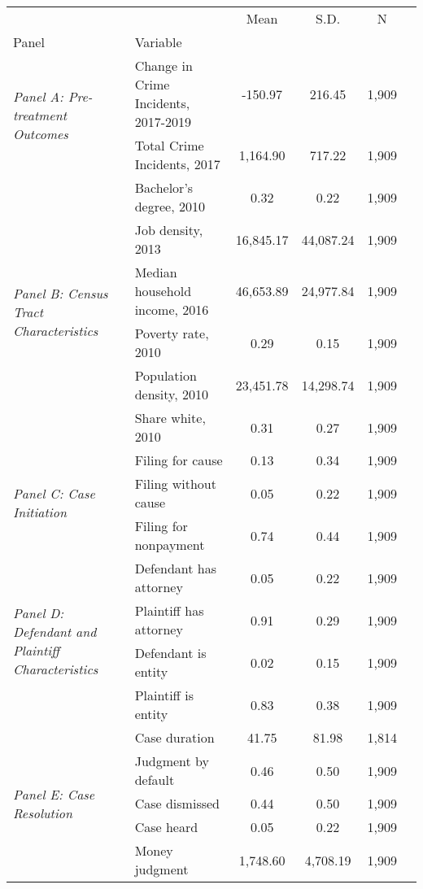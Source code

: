 \begin{tabular}{llcccc}
\toprule
 &  & Mean & S.D. & N \\
Panel & Variable &  &  &  \\
\midrule
\multirow[c]{2}{4cm}{\textit{Panel A: Pre-treatment Outcomes}} & Change in Crime Incidents, 2017-2019 & -150.97 & 216.45 & 1,909 \\
 & Total Crime Incidents, 2017 & 1,164.90 & 717.22 & 1,909 \\
\cline{1-5}
\multirow[c]{6}{4cm}{\textit{Panel B: Census Tract Characteristics}} & Bachelor's degree, 2010 & 0.32 & 0.22 & 1,909 \\
 & Job density, 2013 & 16,845.17 & 44,087.24 & 1,909 \\
 & Median household income, 2016 & 46,653.89 & 24,977.84 & 1,909 \\
 & Poverty rate, 2010 & 0.29 & 0.15 & 1,909 \\
 & Population density, 2010 & 23,451.78 & 14,298.74 & 1,909 \\
 & Share white, 2010 & 0.31 & 0.27 & 1,909 \\
\cline{1-5}
\multirow[c]{3}{4cm}{\textit{Panel C: Case Initiation}} & Filing for cause & 0.13 & 0.34 & 1,909 \\
 & Filing without cause & 0.05 & 0.22 & 1,909 \\
 & Filing for nonpayment & 0.74 & 0.44 & 1,909 \\
\cline{1-5}
\multirow[c]{4}{4cm}{\textit{Panel D: Defendant and Plaintiff Characteristics}} & Defendant has attorney & 0.05 & 0.22 & 1,909 \\
 & Plaintiff has attorney & 0.91 & 0.29 & 1,909 \\
 & Defendant is entity & 0.02 & 0.15 & 1,909 \\
 & Plaintiff is entity & 0.83 & 0.38 & 1,909 \\
\cline{1-5}
\multirow[c]{5}{4cm}{\textit{Panel E: Case Resolution}} & Case duration & 41.75 & 81.98 & 1,814 \\
 & Judgment by default & 0.46 & 0.50 & 1,909 \\
 & Case dismissed & 0.44 & 0.50 & 1,909 \\
 & Case heard & 0.05 & 0.22 & 1,909 \\
 & Money judgment & 1,748.60 & 4,708.19 & 1,909 \\
\cline{1-5}
\bottomrule
\end{tabular}
